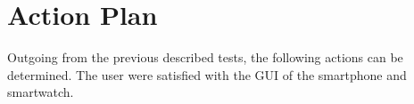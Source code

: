 \section{Action Plan}
Outgoing from the previous described tests, the following actions can be determined.
The user were satisfied with the GUI of the smartphone and smartwatch.
